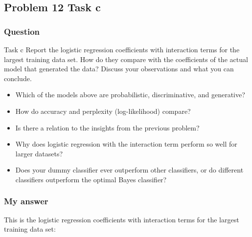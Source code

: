 \documentclass[
]{article}
\begin{document}
\hypertarget{problem-12-task-c}{%
\subsection{Problem 12 Task c}\label{problem-12-task-c}}

\hypertarget{question-10}{%
\subsubsection{Question}\label{question-10}}

Task c Report the logistic regression coeﬀicients with interaction terms
for the largest training data set. How do they compare with the
coeﬀicients of the actual model that generated the data? Discuss your
observations and what you can conclude.

\begin{itemize}
\item
  Which of the models above are probabilistic, discriminative, and
  generative?
\item
  How do accuracy and perplexity (log-likelihood) compare?
\item
  Is there a relation to the insights from the previous problem?
\item
  Why does logistic regression with the interaction term perform so well
  for larger datasets?
\item
  Does your dummy classifier ever outperform other classifiers, or do
  different classifiers outperform the optimal Bayes classifier?
\end{itemize}

\hypertarget{my-answer-10}{%
\subsubsection{My answer}\label{my-answer-10}}

This is the logistic regression coeﬀicients with interaction terms for
the largest training data set:
\end{document}
